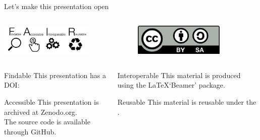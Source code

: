 \begin{frame}{Let's make this presentation open}

	\begin{columns}[t]
		\begin{column}{.45\textwidth}
		    \centering
		    \includegraphics[height=1.5cm]{images/1280px-FAIR_data_principles.jpg}

		\end{column}

		\begin{column}{.45\textwidth}
		    \centering
		    \includegraphics[height=1.5cm]{images/cc-by-sa.png}
        \end{column}
	\end{columns}

	\begin{columns}[t]
		\begin{column}{.45\textwidth}
		    \centering
		    \begin{block}{Findable}
			    This presentation has a DOI:
		    \end{block}

		    \begin{block}{Accessible}
			    This presentation is archived at Zenodo.org. \\
			    The source code is available through GitHub.
		    \end{block}
        \end{column}

		\begin{column}{.45\textwidth}
		    \centering
		    \begin{block}{Interoperable}
			    This material is produced using the \LaTeX\space `Beamer' package.
		    \end{block}

		    \begin{block}{Reusable}
			    This material is reusable under the .
		    \end{block}
        \end{column}
	\end{columns}
\end{frame}